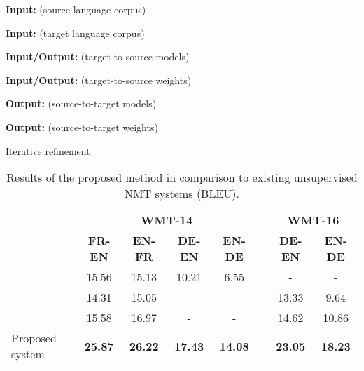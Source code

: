 \documentclass[11pt,a4paper]{article}
\begin{document}
\begin{algorithm}[t]
\begin{algorithmic}[1]
\item[\textbf{Input:}  (source language corpus)]
\item[\textbf{Input:}  (target language corpus)]
\item[\textbf{Input/Output:}  (target-to-source models)]
\item[\textbf{Input/Output:}  (target-to-source weights)]
\item[\textbf{Output:}  (source-to-target models)]
\item[\textbf{Output:}  (source-to-target weights)]
\State  {}
\State  {}
\Repeat
  \State  {}
  \State  {}
  \State  {}
  \State  {}
  \State  {}
  \State  {}
  \State  {}
  \State  {}
\end{algorithmic}
\caption{Iterative refinement}
\label{alg:refinement}
\end{algorithm}

\begin{table*}[t]
\begin{center}
  \begin{tabular}{lccccccc}
    \toprule
    & \multicolumn{4}{c}{\bf WMT-14} & & \multicolumn{2}{c}{\bf WMT-16} \\
    \cmidrule{2-5} \cmidrule{7-8}
    & \multicolumn{1}{c}{\bf FR-EN} & \multicolumn{1}{c}{\bf EN-FR} & \multicolumn{1}{c}{\bf DE-EN} & \multicolumn{1}{c}{\bf EN-DE} & & \multicolumn{1}{c}{\bf DE-EN} & \multicolumn{1}{c}{\bf EN-DE} \\
    \midrule
    \citet{artetxe2018unsupervised} & 15.56 & 15.13 & 10.21 & 6.55 & & - & - \\
    \citet{lample2018unsupervised} & 14.31 & 15.05 & - & - & & 13.33 & 9.64 \\
    \citet{yang2018unsupervised} & 15.58 & 16.97 & - & - & & 14.62 & 10.86 \\
    \midrule
    Proposed system & \bf 25.87 & \bf 26.22 & \bf 17.43 & \bf 14.08 & & \bf 23.05 & \bf 18.23 \\
    \bottomrule
  \end{tabular}
\end{center}
\caption{Results of the proposed method in comparison to existing unsupervised NMT systems (BLEU).}
\label{tab:results_sota}
\end{table*}
\end{document}

